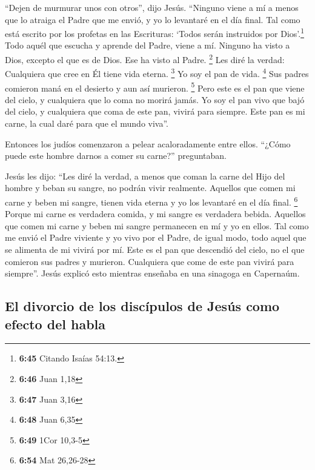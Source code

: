  ``Dejen de murmurar unos con otros'', dijo Jesús.
 ``Ninguno viene a mí a menos que lo atraiga el Padre que
me envió, y yo lo levantaré en el día final.  Tal como
está escrito por los profetas en las Escrituras: `Todos serán instruidos
por Dios'.\footnote{\textbf{6:45} Citando Isaías 54:13.} Todo aquél que
escucha y aprende del Padre, viene a mí.  Ninguno ha
visto a Dios, excepto el que es de Dios. Ese ha visto al Padre.
\footnote{\textbf{6:46} Juan 1,18}  Les diré la verdad:
Cualquiera que cree en Él tiene vida eterna. \footnote{\textbf{6:47}
  Juan 3,16}  Yo soy el pan de vida. \footnote{\textbf{6:48}
  Juan 6,35}  Sus padres comieron maná en el desierto y
aun así murieron. \footnote{\textbf{6:49} 1Cor 10,3-5} 
Pero este es el pan que viene del cielo, y cualquiera que lo coma no
morirá jamás.  Yo soy el pan vivo que bajó del cielo, y
cualquiera que coma de este pan, vivirá para siempre. Este pan es mi
carne, la cual daré para que el mundo viva''.

 Entonces los judíos comenzaron a pelear acaloradamente
entre ellos. ``¿Cómo puede este hombre darnos a comer su carne?''
preguntaban.

 Jesús les dijo: ``Les diré la verdad, a menos que coman
la carne del Hijo del hombre y beban su sangre, no podrán vivir
realmente.  Aquellos que comen mi carne y beben mi
sangre, tienen vida eterna y yo los levantaré en el día final.
\footnote{\textbf{6:54} Mat 26,26-28}  Porque mi carne es
verdadera comida, y mi sangre es verdadera bebida. 
Aquellos que comen mi carne y beben mi sangre permanecen en mí y yo en
ellos.  Tal como me envió el Padre viviente y yo vivo por
el Padre, de igual modo, todo aquel que se alimenta de mi vivirá por mí.
 Este es el pan que descendió del cielo, no el que
comieron sus padres y murieron. Cualquiera que come de este pan vivirá
para siempre''.  Jesús explicó esto mientras enseñaba en
una sinagoga en Capernaúm.

\hypertarget{el-divorcio-de-los-discuxedpulos-de-jesuxfas-como-efecto-del-habla}{%
\subsection{El divorcio de los discípulos de Jesús como efecto del
habla}\label{el-divorcio-de-los-discuxedpulos-de-jesuxfas-como-efecto-del-habla}}


